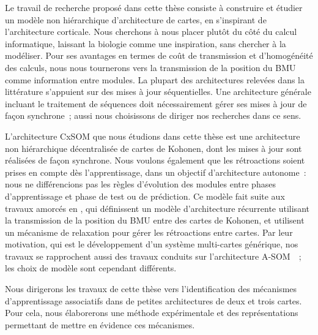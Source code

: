 \documentclass[../main]{subfiles}
\begin{document}
Le travail de recherche proposé dans cette thèse consiste à construire et étudier un modèle non hiérarchique d'architecture de cartes, en s'inspirant de l'architecture corticale. Nous cherchons à nous placer plutôt du côté du calcul informatique, laissant la biologie comme une inspiration, sans chercher à la modéliser.
Pour ses avantages en termes de coût de transmission et d'homogénéité des calculs, nous nous tournerons vers la transmission de la position du BMU comme information entre modules.
La plupart des architectures relevées dans la littérature s'appuient sur des mises à jour séquentielles. 
Une architecture générale incluant le traitement de séquences doit nécessairement gérer ses mises à jour de façon synchrone~; aussi nous choisissons de diriger nos recherches dans ce sens.

L'architecture CxSOM que nous étudions dans cette thèse est une architecture non hiérarchique décentralisée de cartes de Kohonen, dont les mises à jour sont réalisées de façon synchrone. Nous voulons également que les rétroactions soient prises en compte dès l'apprentissage, dans un objectif d'architecture autonome~: nous ne différencions pas les règles d'évolution des modules entre phases d'apprentissage et phase de test ou de prédiction.
Ce modèle fait suite aux travaux amorcés en \cite{baheux_towards_2014}, qui définissent un modèle d'architecture récurrente utilisant la transmission de la position du BMU entre des cartes de Kohonen, et utilisent un mécanisme de relaxation pour gérer les rétroactions entre cartes.
Par leur motivation, qui est le développement d'un système multi-cartes générique, nos travaux se rapprochent aussi des travaux conduits sur l'architecture A-SOM~\cite{johnsson_associating_2008, johnsson_associative_2009,gil_sarasom_2015, Buonamente2015DiscriminatingAS}~; les choix de modèle sont cependant différents.

Nous dirigerons les travaux de cette thèse vers l'identification des mécanismes d'apprentissage associatifs dans de petites architectures de deux et trois cartes. Pour cela, nous élaborerons une méthode expérimentale et des représentations permettant de mettre en évidence ces mécanismes.


\ifSubfilesClassLoaded{
    \printbibliography
}{}
\end{document}
